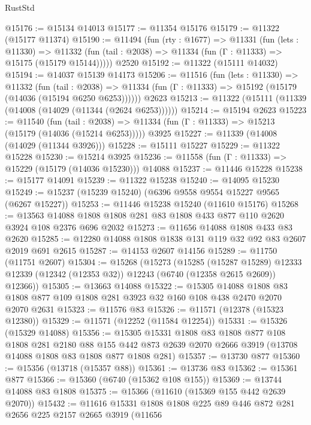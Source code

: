 \begin{lexlean}{RustStd}
\begin{coremodule}
@15176 := @15134 @14013
@15177 := @11354 @15176
@15179 := @11322 (@15177 @11374)
@15190 := @11494
    (fun (rty : @1677) =>
    @11331
      (fun (lets : @11330) =>
      @11332 (fun (tail : @2038) => @11334 (fun (Γ : @11333) => @15175 (@15179 @15144)))))
    @2520
@15192 := @11322 (@15111 @14032)
@15194 := @14037 @15139 @14173
@15206 := @11516
    (fun (lets : @11330) =>
    @11332
      (fun (tail : @2038) =>
      @11334 (fun (Γ : @11333) => @15192 (@15179 (@14036 (@15194 @6250 @6253))))))
    @2623
@15213 := @11322 (@15111 (@11339 (@14008 (@14029 (@11344 (@2624 @6253))))))
@15214 := @15194 @2623
@15223 := @11540
    (fun (tail : @2038) => @11334 (fun (Γ : @11333) => @15213 (@15179 (@14036 (@15214 @6253)))))
    @3925
@15227 := @11339 (@14008 (@14029 (@11344 @3926)))
@15228 := @15111 @15227
@15229 := @11322 @15228
@15230 := @15214 @3925
@15236 := @11558 (fun (Γ : @11333) => @15229 (@15179 (@14036 @15230))) @14088
@15237 := @11446 @15228
@15238 := @15177 @14091
@15239 := @11322 @15238
@15240 := @14095 @15230
@15249 := @15237 (@15239 @15240) (@6396 @9558 @9554 @15227 @9565 (@6267 @15227))
@15253 := @11446 @15238 @15240 (@11610 @15176)
@15268 := @13563 @14088 @1808 @1808 @281 @83 @1808 @433 @877 @110 @2620 @3924 @108 @2376 @696 @2032
@15273 := @11656 @14088 @1808 @433 @83 @2620
@15285 := @12280 @14088 @1808 @1838 @131 @119 @32 @92 @83 @2607 @2019 @691 @2615
@15287 := @14153 @2607 @14156
@15289 := @11750 (@11751 @2607)
@15304 := @15268
    (@15273
      (@15285
        (@15287 @15289)
        @12333
        @12339
        (@12342 (@12353 @32))
        @12243
        (@6740 (@12358 @2615 @2609))
        @12366))
@15305 := @13663 @14088
@15322 := @15305
    @14088
    @1808
    @83
    @1808
    @877
    @109
    @1808
    @281
    @3923
    @32
    @160
    @108
    @438
    @2470
    @2070
    @2070
    @2631
@15323 := @11576 @83
@15326 := @11571 (@12378 (@15323 @12380))
@15329 := @11571 (@12252 (@11584 @12254))
@15331 := @15326 (@15329 @14088)
@15356 := @15305
    @15331
    @1808
    @83
    @1808
    @877
    @108
    @1808
    @281
    @2180
    @88
    @155
    @442
    @873
    @2639
    @2070
    @2666
    @3919
    (@13708 @14088 @1808 @83 @1808 @877 @1808 @281)
@15357 := @13730 @877
@15360 := @15356 (@13718 (@15357 @88))
@15361 := @13736 @83
@15362 := @15361 @877
@15366 := @15360 (@6740 (@15362 @108 @155))
@15369 := @13744 @14088 @83 @1808
@15375 := @15366 (@11610 (@15369 @155 @442 @2639 @2070))
@15432 := @11616
    @15331
    @1808
    @1808
    @225
    @89
    @446
    @872
    @281
    @2656
    @225
    @2157
    @2665
    @3919
    (@11656

\end{coremodule}
\end{lexlean}

